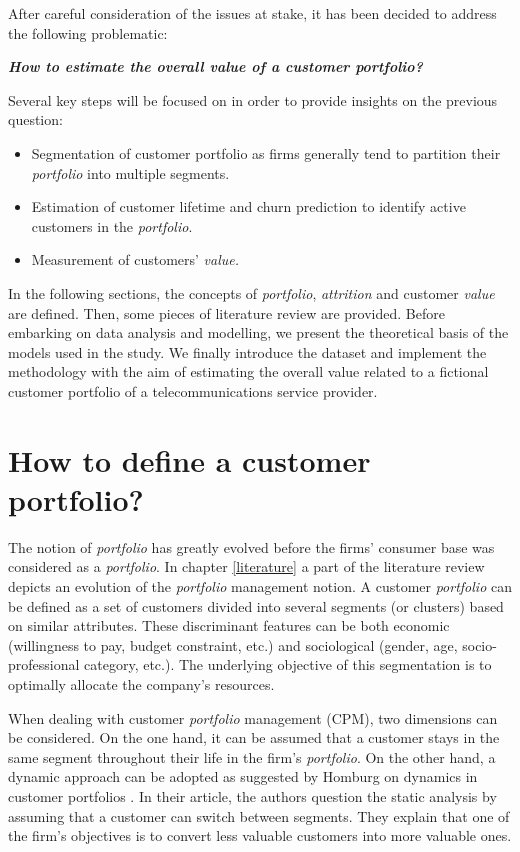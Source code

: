 \documentclass[
]{book}
\providecommand{\tightlist}{%
  \setlength{\itemsep}{0pt}\setlength{\parskip}{0pt}}
\begin{document}
After careful consideration of the issues at stake, it has been decided to address the following problematic:

\textbf{\emph{How to estimate the overall value of a customer portfolio?}}

Several key steps will be focused on in order to provide insights on the previous question:

\begin{itemize}
\tightlist
\item
  Segmentation of customer portfolio as firms generally tend to partition their \emph{portfolio} into multiple segments.
\item
  Estimation of customer lifetime and churn prediction to identify active customers in the \emph{portfolio}.
\item
  Measurement of customers' \emph{value.}
\end{itemize}

In the following sections, the concepts of \emph{portfolio}, \emph{attrition} and customer \emph{value} are defined. Then, some pieces of literature review are provided. Before embarking on data analysis and modelling, we present the theoretical basis of the models used in the study. We finally introduce the dataset and implement the methodology with the aim of estimating the overall value related to a fictional customer portfolio of a telecommunications service provider.

\hypertarget{portfoliodef}{%
\section{How to define a customer portfolio?}\label{portfoliodef}}

The notion of \emph{portfolio} has greatly evolved before the firms' consumer base was considered as a \emph{portfolio}. In chapter \ref{literature} a part of the literature review depicts an evolution of the \emph{portfolio} management notion. A customer \emph{portfolio} can be defined as a set of customers divided into several segments (or clusters) based on similar attributes. These discriminant features can be both economic (willingness to pay, budget constraint, etc.) and sociological (gender, age, socio-professional category, etc.). The underlying objective of this segmentation is to optimally allocate the company's resources.

When dealing with customer \emph{portfolio} management (CPM), two dimensions can be considered. On the one hand, it can be assumed that a customer stays in the same segment throughout their life in the firm's \emph{portfolio}. On the other hand, a dynamic approach can be adopted as suggested by Homburg on dynamics in customer portfolios \citep{MANAGING_DYNAMICS_CUSTOMER_PORTFOLIO}. In their article, the authors question the static analysis by assuming that a customer can switch between segments. They explain that one of the firm's objectives is to convert less valuable customers into more valuable ones.
\end{document}

